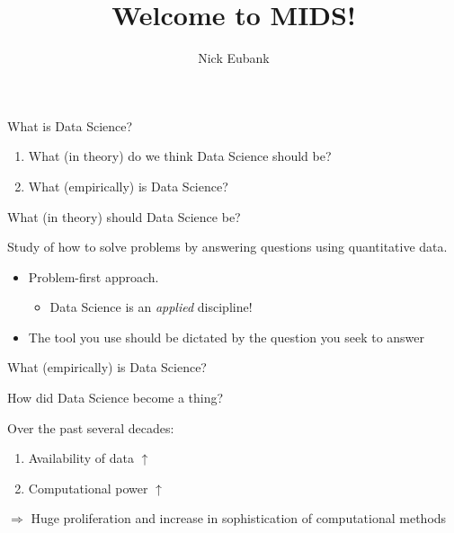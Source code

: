 \documentclass[11pt]{beamer}
\title{Welcome to MIDS!}
\author{\small Nick Eubank}
\date{\vspace*{.3in} \date}
\begin{document}
\begin{frame}
\maketitle
\end{frame}


\begin{frame}[c]{What is Data Science?}
\begin{enumerate}
	\pause \item What (\alert{in theory}) do we think Data Science should be?
	\pause \item What (\alert{empirically}) is Data Science?
\end{enumerate}
\end{frame}


\begin{frame}[c]{What (in theory) should Data Science be?}

\pause Study of how to \alert{solve problems} \pause by \alert{answering questions} \pause using \alert{quantitative data.}

\pause
\begin{itemize}
	\item Problem-first approach. 
	\begin{itemize}
		\pause \item Data Science is an \emph{applied} discipline!
	\end{itemize} 
	\pause \item The tool you use should be dictated by the question you seek to answer
\end{itemize}

\end{frame}

\begin{frame}[c]{What (empirically) is Data Science?}

\end{frame}

\begin{frame}[c]{How did Data Science become a thing?}

Over the past several decades:
\begin{enumerate}
	\item Availability of data $\uparrow$
	\item Computational power $\uparrow$
\end{enumerate}
\pause
$\Rightarrow$ Huge proliferation and increase in sophistication of computational methods
\end{frame}
\end{document}
